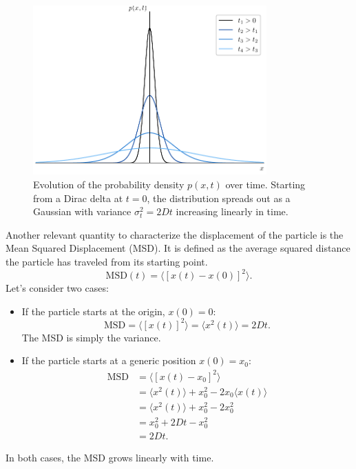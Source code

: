 \begin{figure}[h!]
    \centering
    \includegraphics[width=0.8\textwidth]{images/gaussian_evolution.pdf}
    \caption{Evolution of the probability density $p(x,t)$ over time. Starting from a Dirac delta at $t=0$, the distribution spreads out as a Gaussian with variance $\sigma_t^2=2Dt$ increasing linearly in time.}
    \label{fig:gaussian_evolution}
\end{figure}


Another relevant quantity to characterize the displacement of the particle is the Mean Squared Displacement (MSD). It is defined as the average squared distance the particle has traveled from its starting point.
\[
\text{MSD}(t) = \langle [x(t) - x(0)]^2 \rangle.
\]
Let's consider two cases:
\begin{itemize}
    \item If the particle starts at the origin, $x(0)=0$:
    \[
    \text{MSD} = \langle [x(t)]^2 \rangle = \langle x^2(t) \rangle = 2Dt.
    \]
    The MSD is simply the variance.

    \item If the particle starts at a generic position $x(0)=x_0$: 
    \begin{align*}
        \text{MSD} &= \langle [x(t) - x_0]^2 \rangle \\
        &= \langle x^2(t)\rangle + x_0^2 - 2x_0  \langle x(t)\rangle\\
        &= \langle x^2(t)\rangle + x_0^2 - 2x_0^2  \\
        & = x_0^2  + 2Dt - x_0^2 \\
        & = 2Dt.
    \end{align*}
\end{itemize}
In both cases, the MSD grows linearly with time. 

